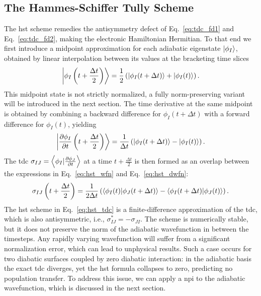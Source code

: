 \subsection{The Hammes-Schiffer Tully Scheme}\label{sec:hammes_schiffer_tully_scheme}
The \gls{hst}\supercite{10.1063/1.467455} scheme remedies the antisymmetry defect of Eq.~\eqref{eq:tdc_fd1} and Eq.~\eqref{eq:tdc_fd2}, making the electronic Hamiltonian Hermitian. To that end we first introduce a midpoint approximation for each adiabatic eigenstate $\ket{\phi_I}$, obtained by linear interpolation between its values at the bracketing time slices
\begin{equation}\label{eq:hst_wfn}
\Ket{\phi_I\left(t+\frac{\Delta t}{2}\right)}=\frac{1}{2}\left(\Ket{\phi_I(t+\Delta t)}+\Ket{\phi_I(t)}\right).
\end{equation}
This midpoint state is not strictly normalized, a fully norm-preserving variant will be introduced in the next section. The time derivative at the same midpoint is obtained by combining a backward difference for $\phi_I(t+\Delta t)$ with a forward difference for $\phi_I(t)$, yielding
\begin{equation}\label{eq:hst_dwfn}
\Ket{\frac{\partial\phi_I}{\partial t}\left(t+\frac{\Delta t}{2}\right)}=\frac{1}{\Delta t}\left(\Ket{\phi_I(t+\Delta t)}-\Ket{\phi_I(t)}\right).
\end{equation}
The \gls{tdc} $\sigma_{IJ}=\Braket{\phi_I\vert\frac{\partial \phi_J}{\partial t}}$ at a time $t+\frac{\Delta t}{2}$ is then formed as an overlap between the expressions in Eq.~\eqref{eq:hst_wfn} and Eq.~\eqref{eq:hst_dwfn}:
\begin{equation}\label{eq:hst_tdc}
\sigma_{IJ}\left(t+\frac{\Delta t}{2}\right)=\frac{1}{2\Delta t}\left(\Braket{\phi_I(t)\vert\phi_J(t+\Delta t)}-\Braket{\phi_I(t+\Delta t)\vert\phi_J(t)}\right).
\end{equation}
The \gls{hst} scheme in Eq.~\eqref{eq:hst_tdc} is a finite-difference approximation of the \gls{tdc}, which is also antisymmetric, i.e., $\sigma_{IJ}^\ast=-\sigma_{JI}$. The scheme is numerically stable, but it does not preserve the norm of the adiabatic wavefunction in between the timesteps. Any rapidly varying wavefunction will suffer from a significant normalization error, which can lead to unphysical results. Such a case occurs for two diabatic surfaces coupled by zero diabatic interaction: in the adiabatic basis the exact \gls{tdc} diverges, yet the \gls{hst} formula collapses to zero, predicting no population transfer. To address this issue, we can apply a \gls{npi} to the adiabatic wavefunction, which is discussed in the next section.
